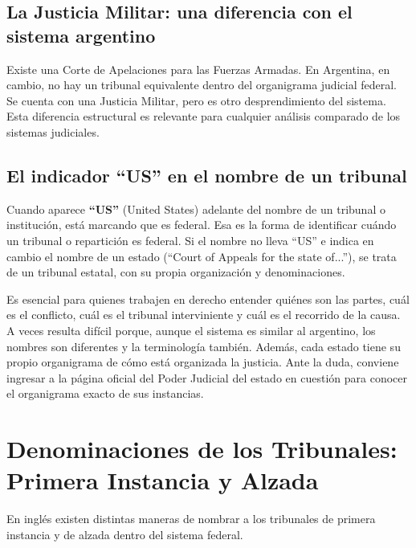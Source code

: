 \documentclass[12pt,oneside]{book}
\begin{document}
\subsection{La Justicia Militar: una diferencia con el sistema argentino}

Existe una Corte de Apelaciones para las Fuerzas Armadas. En Argentina, en cambio, no hay un tribunal equivalente dentro del organigrama judicial federal. Se cuenta con una Justicia Militar, pero es otro desprendimiento del sistema. Esta diferencia estructural es relevante para cualquier análisis comparado de los sistemas judiciales.

\subsection{El indicador ``US'' en el nombre de un tribunal}

Cuando aparece \textbf{``US''} (United States) adelante del nombre de un tribunal o institución, está marcando que es federal. Esa es la forma de identificar cuándo un tribunal o repartición es federal. Si el nombre no lleva ``US'' e indica en cambio el nombre de un estado (``Court of Appeals for the state of...''), se trata de un tribunal estatal, con su propia organización y denominaciones.

\begin{important}
Es esencial para quienes trabajen en derecho entender quiénes son las partes, cuál es el conflicto, cuál es el tribunal interviniente y cuál es el recorrido de la causa. A veces resulta difícil porque, aunque el sistema es similar al argentino, los nombres son diferentes y la terminología también. Además, cada estado tiene su propio organigrama de cómo está organizada la justicia. Ante la duda, conviene ingresar a la página oficial del Poder Judicial del estado en cuestión para conocer el organigrama exacto de sus instancias.
\end{important}

\section{Denominaciones de los Tribunales: Primera Instancia y Alzada}

En inglés existen distintas maneras de nombrar a los tribunales de primera instancia y de alzada dentro del sistema federal.
\end{document}
